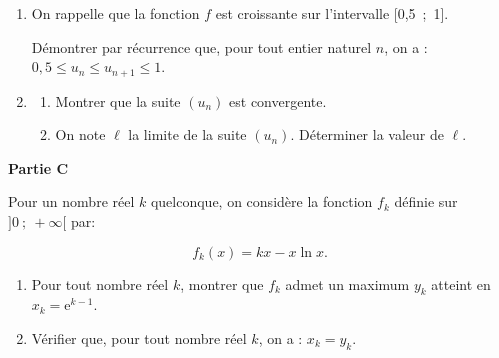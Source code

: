 \documentclass[10pt]{article}
\begin{document}
\begin{enumerate}
\item On rappelle que la fonction $f$ est croissante sur l'intervalle [0,5~;~1].

Démontrer par récurrence que, pour tout entier naturel $n$, on a : $0,5 \leqslant  u_n \leqslant u_{n+1} \leqslant 1$.
\item 
	\begin{enumerate}
		\item Montrer que la suite $\left(u_n\right)$ est convergente.
		\item On note $\ell$ la limite de la suite $\left(u_n\right)$. Déterminer la valeur de $\ell$.
	\end{enumerate}
\end{enumerate}

\bigskip

\textbf{Partie C}

\medskip

Pour un nombre réel $k$ quelconque, on considère la fonction $f_k$ définie sur $]0~;~+\infty[$ par:

\[f_k(x) = kx - x \ln x.\]

\begin{enumerate}
\item Pour tout nombre réel $k$, montrer que $f_k$ admet un maximum $y_k$ atteint en $x_k = \text{e}^{k- 1}$.
\item  Vérifier que, pour tout nombre réel $k$, on a : $x_k = y_k$.
\end{enumerate}

\bigskip
\end{document}

